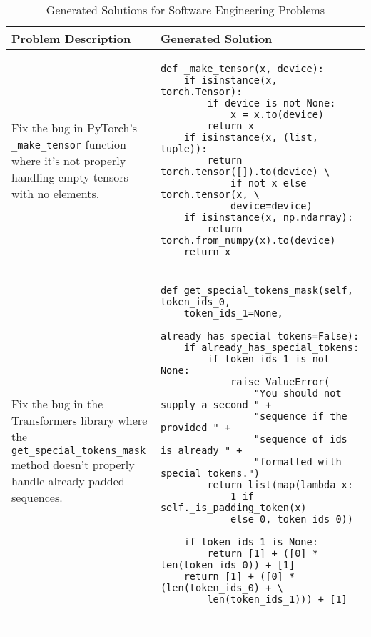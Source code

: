 \begin{table*}[t]
\centering
\caption{Generated Solutions for Software Engineering Problems}
\label{tab:results}
\begin{tabular}{|p{}|p{}|}
\hline
\textbf{Problem Description} & \textbf{Generated Solution} \\
\hline
{\footnotesize Fix the bug in PyTorch's \texttt{\_make\_tensor} function where it's not properly handling empty tensors with no elements.} & 
{\footnotesize
\begin{verbatim}
def _make_tensor(x, device): 
    if isinstance(x, torch.Tensor): 
        if device is not None: 
            x = x.to(device) 
        return x 
    if isinstance(x, (list, tuple)): 
        return torch.tensor([]).to(device) \
            if not x else torch.tensor(x, \
            device=device) 
    if isinstance(x, np.ndarray): 
        return torch.from_numpy(x).to(device) 
    return x
\end{verbatim}
} \\
\hline
{\footnotesize Fix the bug in the Transformers library where the \texttt{get\_special\_tokens\_mask} method doesn't properly handle already padded sequences.} & 
{\footnotesize
\begin{verbatim}
def get_special_tokens_mask(self, token_ids_0,
    token_ids_1=None, 
    already_has_special_tokens=False):
    if already_has_special_tokens:
        if token_ids_1 is not None:
            raise ValueError(
                "You should not supply a second " +
                "sequence if the provided " +
                "sequence of ids is already " +
                "formatted with special tokens.")
        return list(map(lambda x: 
            1 if self._is_padding_token(x) 
            else 0, token_ids_0))

    if token_ids_1 is None:
        return [1] + ([0] * len(token_ids_0)) + [1]
    return [1] + ([0] * (len(token_ids_0) + \
        len(token_ids_1))) + [1]


\end{verbatim}}
\end{tabular}
\end{table*}
